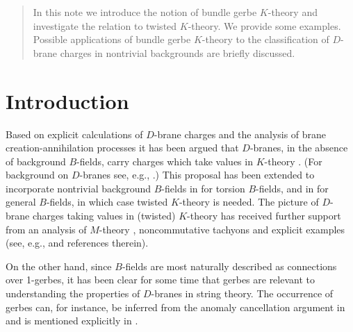 \documentclass[a4paper,reqno]{amsart}
\theoremstyle{plain}
\theoremstyle{definition}
\theoremstyle{remark}
\numberwithin{equation}{section}
\numberwithin{figure}{section}
\newcommand{\<}{\langle}
\renewcommand{\>}{\rangle}
\begin{document}
\begin{abstract}
In this note we introduce the notion of bundle gerbe $K$-theory
and investigate the relation to twisted $K$-theory.  We provide
some examples.  Possible applications of bundle gerbe $K$-theory to
the classification of $D$-brane charges in nontrivial backgrounds are
briefly discussed.
\end{abstract}
\maketitle

\section{Introduction}

Based on explicit calculations of $D$-brane charges and the analysis of
brane creation-annihilation processes it has been argued that
$D$-branes, in the absence of background $B$-fields, carry charges which
take values in $K$-theory \cite{MM,Wit1,Hor,MW}.  (For background on
$D$-branes see, e.g., \cite{Pol}.)  This proposal has been extended
to incorporate nontrivial background $B$-fields in \cite{Wit1,Kap}
for torsion $B$-fields, and in \cite{BM,Ati2} for general $B$-fields,
in which case twisted $K$-theory \cite{Ros} is needed.
The picture of $D$-brane charges taking values in (twisted)
$K$-theory has received further support from an analysis of $M$-theory
\cite{DMW}, noncommutative tachyons \cite{Wit2,HM} and explicit
examples (see, e.g., \cite{FS} and references therein).

On the other hand, since $B$-fields are most naturally
described as connections over 1-gerbes,
it has been clear for some time that gerbes are relevant to
understanding the properties of $D$-branes in string theory.
The occurrence of gerbes
can, for instance, be inferred from the anomaly cancellation
argument in \cite{FW} and is mentioned explicitly in \cite{HM}.
\end{document}
